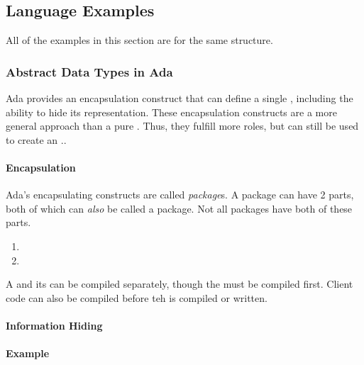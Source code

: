 \subsection{Language Examples}\label{subsec:Abstract_Data_Type_Lang_Examples}
All of the examples in this section are for the same structure.

\subsubsection{Abstract Data Types in Ada}\label{subsubsec:Abstract_Data_Types_Ada}
Ada provides an encapsulation construct that can define a single , including the ability to hide its representation.
These encapsulation constructs are a more general approach than a pure .
Thus, they fulfill more roles, but can still be used to create an ..

\paragraph{Encapsulation}\label{par:Ada_Encapsulation}
\begin{definition}[Package]\label{def:Ada_Package}
  Ada's encapsulating constructs are called \emph{package}s.
  A package can have 2 parts, both of which can \textit{also} be called a package.
  Not all packages have both of these parts.
  \begin{enumerate}[noitemsep]
  \item {}
  \item {}
  \end{enumerate}

  A  and its  can be compiled separately, though the  must be compiled first.
  Client code can also be compiled before teh  is compiled or written.
\end{definition}

\paragraph{Information Hiding}\label{par:Ada_Info_Hiding}
\paragraph{Example}\label{par:Ada_Abstract_Data_Type_Example}
